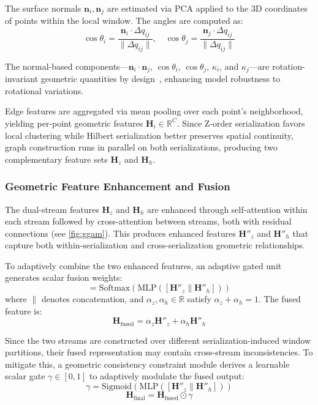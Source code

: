 \documentclass[a4paper,fleqn]{cas-sc}
\begin{document}
The surface normals $\mathbf{n}_i, \mathbf{n}_j$ are estimated via PCA applied to the 3D coordinates of points within the local window. The angles are computed as:
\begin{equation}
	\cos\theta_i = \frac{\mathbf{n}_i \cdot \Delta q_{ij}}{\|\Delta q_{ij}\|}, \quad \cos\theta_j = \frac{\mathbf{n}_j \cdot \Delta q_{ij}}{\|\Delta q_{ij}\|}
\end{equation}

The normal-based components—$\mathbf{n}_i \cdot \mathbf{n}_j$, $\cos\theta_i$, $\cos\theta_j$, $\kappa_i$, and $\kappa_j$—are rotation-invariant geometric quantities by design~\cite{clusterNet, riconv}, enhancing model robustness to rotational variations.

Edge features are aggregated via mean pooling over each point's neighborhood, yielding per-point geometric features $\mathbf{H}_i \in \mathbb{R}^C$. Since Z-order serialization favors local clustering while Hilbert serialization better preserves spatial continuity, graph construction runs in parallel on both serializations, producing two complementary feature sets $\mathbf{H}_z$ and $\mathbf{H}_h$.

\subsubsection{Geometric Feature Enhancement and Fusion}

The dual-stream features $\mathbf{H}_z$ and $\mathbf{H}_h$ are enhanced through self-attention within each stream followed by cross-attention between streams, both with residual connections (see \cref{fig:ggam}). This produces enhanced features $\mathbf{H}''_z$ and $\mathbf{H}''_h$ that capture both within-serialization and cross-serialization geometric relationships.

To adaptively combine the two enhanced features, an adaptive gated unit generates scalar fusion weights:
\begin{equation}
	[\alpha_z, \alpha_h] = \text{Softmax}(\text{MLP}([\mathbf{H}''_z \| \mathbf{H}''_h]))
\end{equation}
where $\|$ denotes concatenation, and $\alpha_z, \alpha_h \in \mathbb{R}$ satisfy $\alpha_z + \alpha_h = 1$. The fused feature is:
\begin{equation}
	\mathbf{H}_{\text{fused}} = \alpha_z \mathbf{H}''_z + \alpha_h \mathbf{H}''_h
\end{equation}

Since the two streams are constructed over different serialization-induced window partitions, their fused representation may contain cross-stream inconsistencies. To mitigate this, a geometric consistency constraint module derives a learnable scalar gate $\gamma \in [0,1]$ to adaptively modulate the fused output:
\begin{equation}
	\gamma = \text{Sigmoid}(\text{MLP}([\mathbf{H}''_z \| \mathbf{H}''_h]))
\end{equation}
\begin{equation}
	\mathbf{H}_{\text{final}} = \mathbf{H}_{\text{fused}} \odot \gamma
\end{equation}
\end{document}
